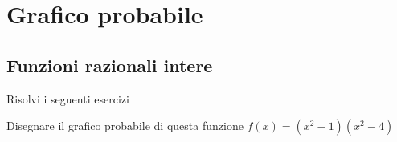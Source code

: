 \chapter{Grafico probabile}
\section{Funzioni razionali intere}
Risolvi i seguenti esercizi
\tcbstartrecording

%	
%	
%	
%		
%		
%		
%		
%		
%		
\begin{exercise}[no solution]
	Disegnare il grafico probabile di questa funzione $f(x)=(x^2-1)(x^2-4)$
\end{exercise}
